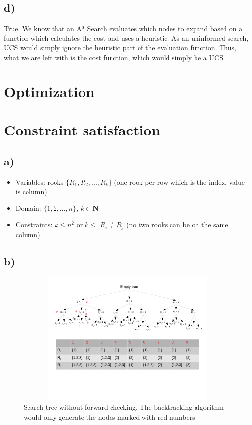 \documentclass[11pt,letterpaper]{article}
\begin{document}
	    \subsection{d)}
	    True.
	    We know that an A* Search evaluates which nodes to expand based on a function which calculates the cost and uses a heuristic.
	    As an uninformed search, UCS would simply ignore the heuristic part of the evaluation function.
	    Thus, what we are left with is the cost function, which would simply be a UCS.
	
	\section{Optimization}
	
	\section{Constraint satisfaction}
	    \subsection{a)}
	    \begin{itemize}
            \item Variables: rooks $\{R_1, R_2, ... , R_k\}$ (one rook per row which is the index, value is column)
            \item Domain: $\{1, 2, ... , n\}$, $k \in \mathbf{N}$
            \item Constraints: $k \leq n^2$ or $k \le $ $R_i \neq R_j$ (no two rooks can be on the same column)
        \end{itemize}
        
        \subsection{b)}
        \begin{figure}[ht]
			\centering
			\includegraphics[height=250px,width=425px,trim={0 150 0 0},clip]{q4.pdf}
			\linespread{0.8}\caption{Search tree without forward checking. The backtracking algorithm would only generate the nodes marked with red numbers.}
		\end{figure}
        
\end{document}

